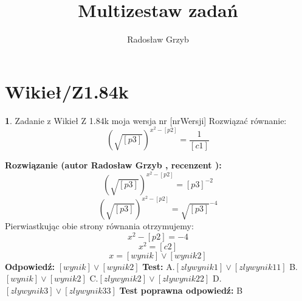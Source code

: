 \documentclass[12pt, a4paper]{article}
\title{Multizestaw zadań}
\author{Radosław Grzyb}
\date{}
\theoremstyle{definition} %
\newtheorem{zad}{}
\newcommand{\kategoria}[1]{\section{#1}} %
\newcommand{\zadStart}[1]{\begin{zad}#1\newline} %
\newcommand{\zadStop}{\end{zad}}   %
\newcommand{\rozwStart}[2]{\noindent \textbf{Rozwiązanie (autor #1 , recenzent #2): }\newline} %
\newcommand{\rozwStop}{\newline}                                            %
\newcommand{\odpStart}{\noindent \textbf{Odpowiedź:}\newline}    %
\newcommand{\odpStop}{\newline}                                             %
\newcommand{\testStart}{\noindent \textbf{Test:}\newline} %
\newcommand{\testStop}{\newline} %
\newcommand{\kluczStart}{\noindent \textbf{Test poprawna odpowiedź:}\newline} %
\newcommand{\kluczStop}{\newline} %
\begin{document}
\maketitle
\kategoria{Wikieł/Z1.84k}
\zadStart{Zadanie z Wikieł Z 1.84k moja wersja nr [nrWersji]}
Rozwiązać równanie:
$$(\sqrt{[p3]})^{x^{2}-[p2]}=\frac{1}{[c1]}$$
\zadStop
\rozwStart{Radosław Grzyb}{}
$$(\sqrt{[p3]})^{x^{2}-[p2]}=[p3]^{-2}$$
$$(\sqrt{[p3]})^{x^{2}-[p2]}=\sqrt{[p3]}^{-4}$$
Pierwiastkując obie strony równania otrzymujemy:
$$x^{2}-[p2]=-4$$
$$x^{2}=[c2]$$
$$x=[wynik] \vee [wynik2]$$
\rozwStop
\odpStart
$[wynik] \vee [wynik2]$
\odpStop
\testStart
A.$[zlywynik1] \vee [zlywynik11]$
B.$[wynik] \vee [wynik2]$
C.$[zlywynik2] \vee [zlywynik22]$
D.$[zlywynik3] \vee [zlywynik33]$
\testStop
\kluczStart
B
\kluczStop
\end{document}

